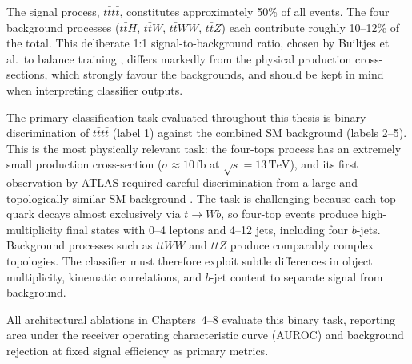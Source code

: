 The signal process, $t\bar{t}t\bar{t}$, constitutes approximately 50\% of all events. The
four background processes ($t\bar{t}H$, $t\bar{t}W$, $t\bar{t}WW$, $t\bar{t}Z$) each
contribute roughly 10--12\% of the total. This deliberate 1:1 signal-to-background ratio,
chosen by Builtjes et al.\ to balance training \cite{builtjesAttentionStrengthsPhysical2025},
differs markedly from the physical production cross-sections, which strongly favour the
backgrounds, and should be kept in mind when interpreting classifier outputs.

The primary classification task evaluated throughout this thesis is binary discrimination
of $t\bar{t}t\bar{t}$ (label 1) against the combined SM background (labels 2--5). This is
the most physically relevant task: the four-tops process has an extremely small production
cross-section ($\sigma \approx 10\,\text{fb}$ at $\sqrt{s} = 13\,\text{TeV}$), and its
first observation by ATLAS required careful discrimination from a large and topologically
similar SM background \cite{collaborationObservationFourtopquarkProduction2023}. The task
is challenging because each top quark decays almost exclusively via $t \to Wb$, so four-top
events produce high-multiplicity final states with 0--4 leptons and 4--12 jets, including
four $b$-jets. Background processes such as $t\bar{t}WW$ and $t\bar{t}Z$ produce
comparably complex topologies. The classifier must therefore exploit subtle differences in
object multiplicity, kinematic correlations, and $b$-jet content to separate signal from
background.

All architectural ablations in Chapters~4--8 evaluate this binary task, reporting area
under the receiver operating characteristic curve (AUROC) and background rejection at fixed
signal efficiency as primary metrics.
